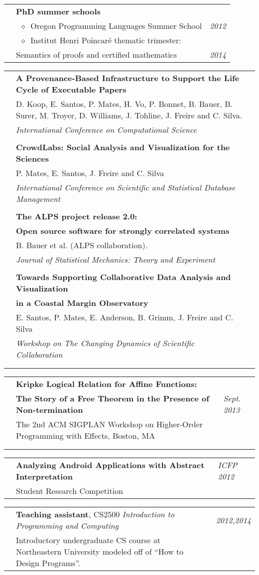 \documentclass[10pt]{article}
\makeatletter
\newcommand{\category}[2]{
\begin{center}
\vskip 6pt
\begin{tabular*}{\textwidth}{@{}p{0.75in}@{\quad\;\;}p{4in}@{\quad\quad}p{0.7in}}
\vcrush[t]{1in}{\textsc{#1}} &
#2
\end{tabular*}
\end{center}
}
\newcommand{\categoryB}[2]{
\begin{center}
\vskip 6pt
\begin{tabular*}{\textwidth}{@{}p{0.75in}@{\quad\;\;}p{4.4in}@{\quad\quad}p{0.3in}}
\vcrush[t]{1in}{\textsc{#1}} &
#2
\end{tabular*}
\end{center}
}
\newcommand{\n}{\\ & }
\newcommand{\nn}{\\ \n}
\newcommand{\DT}[1]{&\hspace{\stretch 1}\textit{#1}}
\newcommand{\conf}[1]{&\hspace{\stretch 1}\crushr{\textit{#1}}}
\newcommand{\citem}{~$\diamond$~}
\newcommand{\ed}[1]{}
\makeatother
\begin{document}

\category{Training}{

{\bf PhD summer schools} \n
\citem Oregon Programming Languages Summer School \DT{\ed{July }2012} \n
\citem Institut Henri Poincar\'e thematic trimester: \n
\quad Semantics of proofs and certified mathematics \DT{\ed{August }2014}%
}


\categoryB{Publications}
{

{\bf A Provenance-Based Infrastructure to Support the Life Cycle of Executable Papers} \conf{\mbox{ICCS 2011}}\n
D. Koop, E. Santos, P. Mates, H. Vo, P. Bonnet, B. Bauer, B. Surer, M. Troyer, D. Williams, J. Tohline, J. Freire and C. Silva.\n
{\em International Conference on Computational Science}\nn

{\bf CrowdLabs: Social Analysis and Visualization for the Sciences} \conf{\mbox{SSDBM 2011}}\n
P. Mates, E. Santos, J. Freire and C. Silva\n
{\em International Conference on Scientific and Statistical Database Management}\nn

{\bf The ALPS project release 2.0:}\n
{\bf Open source software for strongly correlated systems} \conf{\mbox{JSTAT 2011}}\n
B. Bauer et al. (ALPS collaboration).\n
{\em Journal of Statistical Mechanics: Theory and Experiment}\nn

{\bf Towards Supporting Collaborative Data Analysis and Visualization}\n
{\bf in a Coastal Margin Observatory} \conf{\mbox{CSCW 2010}}\n
E. Santos, P. Mates, E. Anderson, B. Grimm, J. Freire and C. Silva\n
{\em Workshop on The Changing Dynamics of Scientific Collaboration}\nn
}
\vspace{-3em}
\category{Talks}{
{\bf  Kripke Logical Relation for Affine Functions:}\n
{\bf The Story of a Free Theorem in the Presence of Non-termination} \DT{Sept. 2013}\n
The 2nd ACM SIGPLAN Workshop on Higher-Order Programming with Effects, Boston, MA\nn
}
\vspace{-3em}
\category{Posters}{
{\bf Analyzing Android Applications with Abstract Interpretation} \DT{ICFP 2012}\n
Student Research Competition }
\vspace{-1em}
\category{Teaching \mbox{experience}}{
{\bf Teaching assistant}, CS2500 \textit{Introduction to Programming and Computing} \DT{2012,2014}\n
Introductory undergraduate CS course at Northeastern University modeled off of ``How to Design Programs''.}
\end{document}
